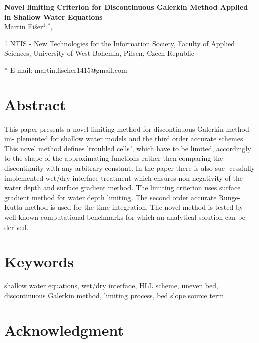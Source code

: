 \documentclass[12pt]{article}
\date{}
\begin{document}
\begin{flushleft}
{\Large
\textbf{Novel limiting Criterion for Discontinuous Galerkin Method Applied in Shallow Water Equations}
}
\\
Martin Fi\v{s}er$^{1,\ast}$,


1 NTIS - New Technologies for the Information Society, Faculty of Applied Sciences,
University of West Bohemia, Pilsen, Czech Republic


$\ast$ E-mail: martin.fischer1415@gmail.com
\end{flushleft}


\section*{Abstract} 

This paper presents a novel limiting method for discontinuous Galerkin method im-
plemented for shallow water models and the third order accurate schemes. This novel
method defines ’troubled cells’, which have to be limited, accordingly to the shape of the approximating functions rather then 
comparing the discontinuity with any arbitrary constant.  In the paper there is also suc-
cessfully implemented wet/dry interface treatment which ensures non-negativity of the
water depth and surface gradient method. The limiting criterion uses surface gradient method for water depth limiting.
The second order accurate Runge-Kutta method is used for the time integration. The
novel method is tested by well-known computational benchmarks for which an analytical
solution can be derived.

\section*{Keywords}

shallow water equations, wet/dry interface, HLL scheme, 
uneven bed, discontinuous Galerkin method, limiting process, bed slope source term






%


\section*{Acknowledgment}


{}
\end{document}

